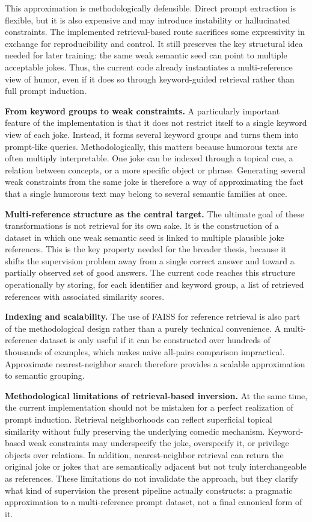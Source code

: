 \documentclass[12pt]{extarticle}
\begin{document}
This approximation is methodologically defensible. Direct prompt extraction is flexible, but it is also expensive and may introduce instability or hallucinated constraints. The implemented retrieval-based route sacrifices some expressivity in exchange for reproducibility and control. It still preserves the key structural idea needed for later training: the same weak semantic seed can point to multiple acceptable jokes. Thus, the current code already instantiates a multi-reference view of humor, even if it does so through keyword-guided retrieval rather than full prompt induction.

\textbf{From keyword groups to weak constraints.} A particularly important feature of the implementation is that it does not restrict itself to a single keyword view of each joke. Instead, it forms several keyword groups and turns them into prompt-like queries. Methodologically, this matters because humorous texts are often multiply interpretable. One joke can be indexed through a topical cue, a relation between concepts, or a more specific object or phrase. Generating several weak constraints from the same joke is therefore a way of approximating the fact that a single humorous text may belong to several semantic families at once.

\textbf{Multi-reference structure as the central target.} The ultimate goal of these transformations is not retrieval for its own sake. It is the construction of a dataset in which one weak semantic seed is linked to multiple plausible joke references. This is the key property needed for the broader thesis, because it shifts the supervision problem away from a single correct answer and toward a partially observed set of good answers. The current code reaches this structure operationally by storing, for each identifier and keyword group, a list of retrieved references with associated similarity scores.

\textbf{Indexing and scalability.} The use of FAISS for reference retrieval is also part of the methodological design rather than a purely technical convenience. A multi-reference dataset is only useful if it can be constructed over hundreds of thousands of examples, which makes naive all-pairs comparison impractical. Approximate nearest-neighbor search therefore provides a scalable approximation to semantic grouping.

\textbf{Methodological limitations of retrieval-based inversion.} At the same time, the current implementation should not be mistaken for a perfect realization of prompt induction. Retrieval neighborhoods can reflect superficial topical similarity without fully preserving the underlying comedic mechanism. Keyword-based weak constraints may underspecify the joke, overspecify it, or privilege objects over relations. In addition, nearest-neighbor retrieval can return the original joke or jokes that are semantically adjacent but not truly interchangeable as references. These limitations do not invalidate the approach, but they clarify what kind of supervision the present pipeline actually constructs: a pragmatic approximation to a multi-reference prompt dataset, not a final canonical form of it.
\end{document}
